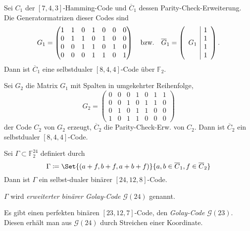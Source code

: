\documentclass{cheat-sheet}
\newcommand{\F}{\mathbb{F}} %
\newcommand{\Golay}{\mathcal{G}} %
\begin{document}
\begin{konstr}
  Sei $C_1$ der $[7, 4, 3]$-Hamming-Code und $\overline{C}_1$ dessen Parity-Check-Erweiterung.
  Die Generatormatrizen dieser Codes sind
  \[
    G_1 = \begin{pmatrix}
      1 & 1 & 0 & 1 & 0 & 0 & 0 \\
      0 & 1 & 1 & 0 & 1 & 0 & 0 \\
      0 & 0 & 1 & 1 & 0 & 1 & 0 \\
      0 & 0 & 0 & 1 & 1 & 0 & 1
    \end{pmatrix}
    \quad \text{bzw.} \quad
    \overline{G}_1 = \left( \begin{array}{c | c}
      \multirow{4}{*}{$G_1$} & 1 \\
      & 1 \\
      & 1 \\
      & 1
    \end{array} \right).
  \]
  Dann ist $\overline{C}_1$ eine selbstdualer $[8,4,4]$-Code über $\F_2$.
  
  Sei $G_2$ die Matrix $G_1$ mit Spalten in umgekehrter Reihenfolge,
  \[
    G_2 = \begin{pmatrix}
      0 & 0 & 0 & 1 & 0 & 1 & 1 \\
      0 & 0 & 1 & 0 & 1 & 1 & 0 \\
      0 & 1 & 0 & 1 & 1 & 0 & 0 \\
      1 & 0 & 1 & 1 & 0 & 0 & 0
    \end{pmatrix}
  \]
  der Code $C_2$ von $G_2$ erzeugt, $\overline{C}_2$ die Parity-Check-Erw. von $C_2$.
  Dann ist $\overline{C}_2$ ein selbstdualer $[8, 4, 4]$-Code.
\end{konstr}

\begin{satz}
  Sei $\Gamma \subset \F_2^{24}$ definiert durch
  \[ \Gamma \coloneqq \Set{(a+f, b+f, a+b+f)}{a, b \in \overline{C}_1, f \in \overline{C}_2} \]
  Dann ist $\Gamma$ ein selbst-dualer binärer $[24, 12, 8]$-Code.
\end{satz}

\begin{defn}
  $\Gamma$ wird \emph{erweiterter binärer Golay-Code $\Golay(24)$} genannt.
\end{defn}


\begin{satz}
  Es gibt einen perfekten binären $[23, 12, 7]$-Code, den \emph{Golay-Code $\Golay(23)$}.
  Diesen erhält man aus $\Golay(24)$ durch Streichen einer Koordinate.
\end{satz}
\end{document}
